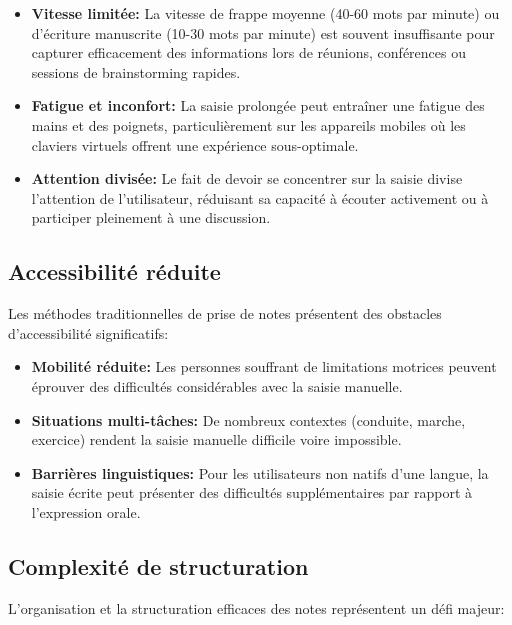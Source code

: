 \begin{itemize}
    \item \textbf{Vitesse limitée:} La vitesse de frappe moyenne (40-60 mots par minute) ou d'écriture manuscrite (10-30 mots par minute) est souvent insuffisante pour capturer efficacement des informations lors de réunions, conférences ou sessions de brainstorming rapides.
    
    \item \textbf{Fatigue et inconfort:} La saisie prolongée peut entraîner une fatigue des mains et des poignets, particulièrement sur les appareils mobiles où les claviers virtuels offrent une expérience sous-optimale.
    
    \item \textbf{Attention divisée:} Le fait de devoir se concentrer sur la saisie divise l'attention de l'utilisateur, réduisant sa capacité à écouter activement ou à participer pleinement à une discussion.
\end{itemize}

\subsection{Accessibilité réduite}

Les méthodes traditionnelles de prise de notes présentent des obstacles d'accessibilité significatifs:

\begin{itemize}
    \item \textbf{Mobilité réduite:} Les personnes souffrant de limitations motrices peuvent éprouver des difficultés considérables avec la saisie manuelle.
    
    \item \textbf{Situations multi-tâches:} De nombreux contextes (conduite, marche, exercice) rendent la saisie manuelle difficile voire impossible.
    
    \item \textbf{Barrières linguistiques:} Pour les utilisateurs non natifs d'une langue, la saisie écrite peut présenter des difficultés supplémentaires par rapport à l'expression orale.
\end{itemize}

\subsection{Complexité de structuration}

L'organisation et la structuration efficaces des notes représentent un défi majeur:

